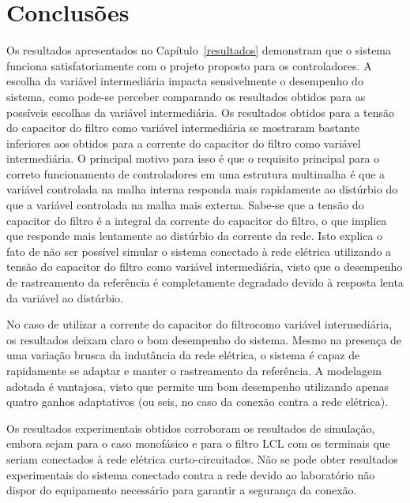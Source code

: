 
\chapter{Conclusões}\label{conclusoes}

  Os resultados apresentados no Capítulo~\ref{resultados} demonstram que o sistema funciona satisfatoriamente com o projeto proposto para os controladores. A escolha da variável intermediária impacta sensivelmente o desempenho do sistema, como pode-se perceber comparando os resultados obtidos para as possíveis escolhas da variável intermediária. Os resultados obtidos para a tensão do capacitor do filtro como variável intermediária se mostraram bastante inferiores aos obtidos para a corrente do capacitor do filtro como variável intermediária. O principal motivo para isso é que o requisito principal para o correto funcionamento de controladores em uma estrutura multimalha é que a variável controlada na malha interna responda mais rapidamente ao distúrbio do que a variável controlada na malha mais externa. Sabe-se que a tensão do capacitor do filtro é a integral da corrente do capacitor do filtro, o que implica que responde mais lentamente ao distúrbio da corrente da rede. Isto explica o fato de não ser possível simular o sistema conectado à rede elétrica utilizando a tensão do capacitor do filtro como variável intermediária, visto que o desempenho de rastreamento da referência é completamente degradado devido à resposta lenta da variável ao distúrbio.

  No caso de utilizar a corrente do capacitor do filtrocomo variável intermediária, os resultados deixam claro o bom desempenho do sistema. Mesmo na presença de uma variação brusca da indutância da rede elétrica, o sistema é capaz de rapidamente se adaptar e manter o rastreamento da referência. A modelagem adotada é vantajosa, visto que permite um bom desempenho utilizando apenas quatro ganhos adaptativos (ou seis, no caso da conexão contra a rede elétrica).

  Os resultados experimentais obtidos corroboram os resultados de simulação, embora sejam para o caso monofásico e para o filtro LCL com os terminais que seriam conectados à rede elétrica curto-circuitados. Não se pode obter resultados experimentais do sistema conectado contra a rede devido ao laboratório não dispor do equipamento necessário para garantir a segurança da conexão.

